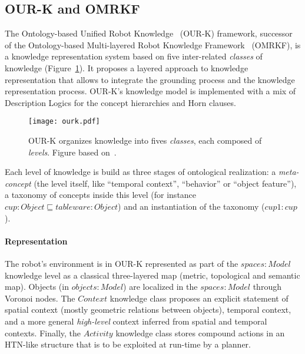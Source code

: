 \documentclass[journal]{IEEEtran}
\begin{document}
\subsection{OUR-K and OMRKF}
\label{sect|omrkf}

The Ontology-based Unified Robot Knowledge~\cite{Lim2011} (OUR-K) framework,
successor of the Ontology-based Multi-layered Robot Knowledge
Framework~\cite{Suh2007} (OMRKF), is a knowledge representation system based on
five inter-related \emph{classes} of knowledge (Figure~\ref{fig|omrkf}). It
proposes a layered approach to knowledge representation that allows to 
integrate the grounding process and the knowledge representation process. OUR-K's
knowledge model is implemented with a mix of Description Logics for the concept
hierarchies and Horn clauses.

\begin{figure}
    \centering
    \texttt{[image: ourk.pdf]}

    \caption{OUR-K organizes knowledge into fives \emph{classes}, each composed
    of \emph{levels}. Figure based on~\cite{Lim2011}.}

    \label{fig|omrkf}
\end{figure}

Each level of knowledge is build as three stages of ontological realization: a
\emph{meta-concept} (the level itself, like ``temporal context'', ``behavior''
or ``object feature''), a taxonomy of concepts inside this level (for instance
$cup : Object \sqsubseteq tableware : Object$) and an instantiation of the
taxonomy ($cup1 : cup$).

\paragraph{Representation} The robot's environment is in OUR-K represented as 
part of the $spaces : Model$ knowledge level as a classical three-layered map 
(metric, topological and semantic map). Objects (in $objects : Model$) are 
localized in the $spaces : Model$ through Voronoi nodes.
% 
The $Context$ knowledge class proposes an explicit statement of spatial context
(mostly geometric relations between objects), temporal context, and a more
general \emph{high-level} context inferred from spatial and temporal contexts.
% 
Finally, the $Activity$ knowledge class stores compound actions in an HTN-like
structure that is to be exploited at run-time by a planner.
\end{document}

